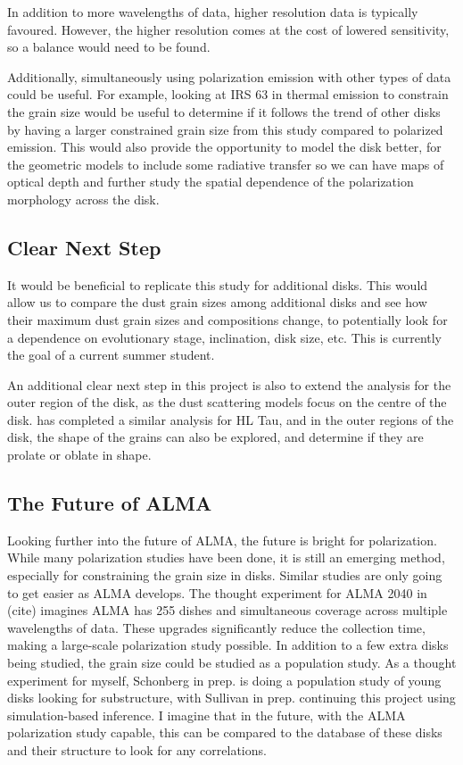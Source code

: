 In addition to more wavelengths of data, higher resolution data is typically favoured. However, the higher resolution comes at the cost of lowered sensitivity, so a balance would need to be found. 


Additionally, simultaneously using polarization emission with other types of data could be useful. For example, looking at IRS 63 in thermal emission to constrain the grain size would be useful to determine if it follows the trend of other disks by having a larger constrained grain size from this study compared to polarized emission. This would also provide the opportunity to model the disk better, for the geometric models to include some radiative transfer so we can have maps of optical depth and further study the spatial dependence of the polarization morphology across the disk. 




\subsection{Clear Next Step}


It would be beneficial to replicate this study for additional disks. This would allow us to compare the dust grain sizes among additional disks and see how their maximum dust grain sizes and compositions change, to potentially look for a dependence on evolutionary stage, inclination, disk size, etc. This is currently the goal of a current summer student. 


An additional clear next step in this project is also to extend the analysis for the outer region of the disk, as the dust scattering models focus on the centre of the disk. \cite{Lin2024} has completed a similar analysis for HL Tau, and in the outer regions of the disk, the shape of the grains can also be explored, and determine if they are prolate or oblate in shape.





\subsection{The Future of ALMA}



Looking further into the future of ALMA, the future is bright for polarization. While many polarization studies have been done, it is still an emerging method, especially for constraining the grain size in disks. Similar studies are only going to get easier as ALMA develops. The thought experiment for ALMA 2040 in (cite) imagines ALMA has 255 dishes and simultaneous coverage across multiple wavelengths of data. These upgrades significantly reduce the collection time, making a large-scale polarization study possible. In addition to a few extra disks being studied, the grain size could be studied as a population study. As a thought experiment for myself, Schonberg in prep. is doing a population study of young disks looking for substructure, with Sullivan in prep. continuing this project using simulation-based inference. I imagine that in the future, with the ALMA polarization study capable, this can be compared to the database of these disks and their structure to look for any correlations.





